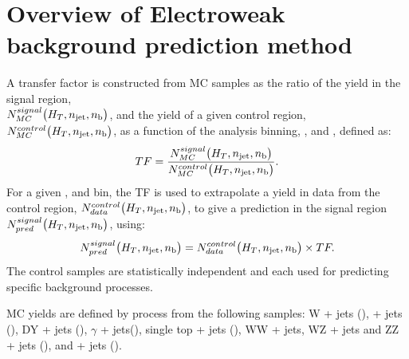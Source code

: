\section{Overview of Electroweak background prediction method}  %
\label{sec:background_overview}

A transfer factor is constructed from MC samples as the ratio 
of the yield in the signal region, \\$N_{MC}^{signal}\big(H_T, n_{\text{jet}}, n_{\text{b}}\big)$,
and the yield of a given control region, \\$N_{MC}^{control}\big(H_T, n_{\text{jet}},
n_{\text{b}}\big)$, as a function of the analysis binning, \HT, \nj and \nb, defined as:
% 
\begin{equation}
TF = \frac{N_{MC}^{signal}\big(H_T, n_{\text{jet}}, n_{\text{b}}\big)}{N_{MC}^{control}\big(H_T, n_{\text{jet}}, n_{\text{b}}\big)} .
\label{eq:transfer_factor}
\end{equation}
% 
For a given \HT, \nj and \nb bin, the TF is used to extrapolate a yield in data from
the control region, $N_{data}^{control}\big(H_T, n_{\text{jet}}, n_{\text{b}}\big)$,
to give a prediction in the signal region $N_{pred}^{signal}\big(H_T, n_{\text{jet}},
n_{\text{b}}\big)$, using:
%
\begin{equation}
N_{pred}^{signal}\big(H_T, n_{\text{jet}}, n_{\text{b}}\big) = N_{data}^{control}\big(H_T, n_{\text{jet}}, n_{\text{b}}\big)
\times TF .
\label{eq:transfer_equation}
\end{equation}
% 
The control samples are statistically independent and each used for predicting 
specific background processes.

MC yields are defined by process from the following samples:
W + jets (\numw),
\ttbar + jets (\numtt), DY + jets (\numdy), $\gamma$ + jets(\numgam),
single top + jets (\numtop), WW + jets, WZ + jets and ZZ + jets (\numdibo), and
\zinv + jets (\numzinv).


